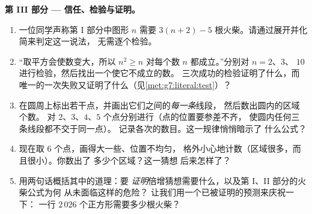\begin{problem}
\medskip
\noindent\textbf{第 III 部分 --- 信任、检验与证明。}
\begin{enumerate}[resume]
  \item 一位同学声称第 I 部分中图形 $n$ 需要
        $3(n + 2) - 5$ 根火柴。请通过展开并化简来判定这一说法，
        无需逐个检验。
  \item “取平方会使数变大，所以 $n^2 \geq n$ 对每个数
        $n$ 都成立。”分别对 $n = 2$、$3$、
        $10$ 进行检验，然后找出一个使它不成立的数。
        三次成功的检验证明了什么，而
        唯一的一次失败又证明了什么（见\cref{met:g7:literal:test}）？
  \item 在圆周上标出若干点，并画出它们之间的\emph{每一条}线段，
        然后数出圆内的区域个数。
        对 $2$、$3$、$4$、$5$ 个点分别进行（点的位置要参差不齐，
        使圆内任何三条线段都不交于同一点）。
        记录各次的数目。这一规律悄悄暗示了
        什么公式？
  \item 现在取 $6$ 个点，画得大一些、位置不均匀，
        格外小心地计数（区域很多，而且很小）。你数出了
        多少个区域？这一猜想
        后来怎样了？
  \item 用两句话概括其中的道理：要
        \emph{证明}倍增猜想需要什么，以及第 I、II 部分的火柴公式为何
        从未面临这样的危险？
        让我们用一个已被证明的预测来庆祝一下：
        一行 $2\,026$ 个正方形需要多少根火柴？
\end{enumerate}
\end{problem}

